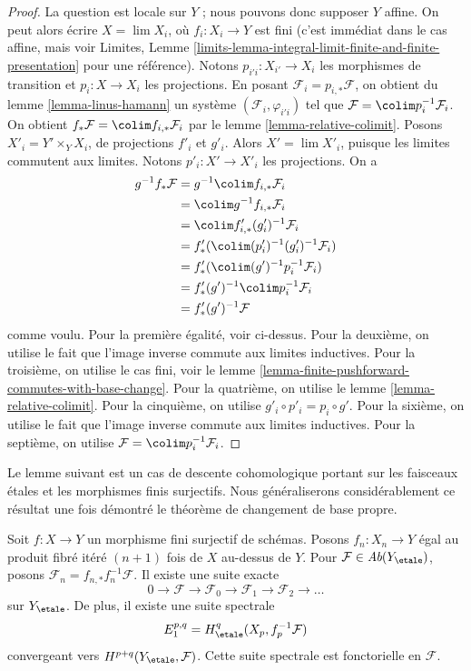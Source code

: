 \begin{proof}
La question est locale sur $Y$ ; nous pouvons donc supposer $Y$ affine.
On peut alors \'ecrire $X = \lim X_i$, o\`u $f_i : X_i \to Y$ est fini
(c'est imm\'ediat dans le cas affine, mais voir
Limites, Lemme \ref{limits-lemma-integral-limit-finite-and-finite-presentation}
pour une r\'ef\'erence). Notons $p_{i'i} : X_{i'} \to X_i$
les morphismes de transition et $p_i : X \to X_i$ les projections.
En posant $\mathcal{F}_i = p_{i, *}\mathcal{F}$, on obtient
du lemme \ref{lemma-linus-hamann}
un syst\`eme $(\mathcal{F}_i, \varphi_{i'i})$
tel que $\mathcal{F} = \colim p_i^{-1}\mathcal{F}_i$.
On obtient $f_*\mathcal{F} = \colim f_{i, *}\mathcal{F}_i$
par le lemme \ref{lemma-relative-colimit}.
Posons $X'_i = Y' \times_Y X_i$, de projections $f'_i$ et $g'_i$.
Alors $X' = \lim X'_i$, puisque les limites commutent aux limites.
Notons $p'_i : X' \to X'_i$ les projections. On a
\begin{align*}
g^{-1}f_*\mathcal{F}
& =
g^{-1} \colim f_{i, *}\mathcal{F}_i \\
& =
\colim g^{-1}f_{i, *}\mathcal{F}_i \\
& =
\colim f'_{i, *}(g'_i)^{-1}\mathcal{F}_i \\
& =
f'_*(\colim (p'_i)^{-1}(g'_i)^{-1}\mathcal{F}_i) \\
& =
f'_*(\colim (g')^{-1}p_i^{-1}\mathcal{F}_i) \\
& =
f'_*(g')^{-1} \colim p_i^{-1}\mathcal{F}_i \\
& =
f'_*(g')^{-1}\mathcal{F}
\end{align*}
comme voulu. Pour la premi\`ere \'egalit\'e, voir ci-dessus.
Pour la deuxi\`eme, on utilise le fait que l'image inverse commute aux limites inductives.
Pour la troisi\`eme, on utilise le cas fini, voir
le lemme \ref{lemma-finite-pushforward-commutes-with-base-change}.
Pour la quatri\`eme, on utilise le lemme \ref{lemma-relative-colimit}.
Pour la cinqui\`eme, on utilise $g'_i \circ p'_i = p_i \circ g'$.
Pour la sixi\`eme, on utilise le fait que l'image inverse commute aux limites inductives.
Pour la septi\`eme, on utilise $\mathcal{F} = \colim p_i^{-1}\mathcal{F}_i$.
\end{proof}

\noindent
Le lemme suivant est un cas de descente cohomologique portant sur
les faisceaux \'etales et les morphismes finis surjectifs. Nous g\'en\'eraliserons
consid\'erablement ce r\'esultat une fois d\'emontr\'e le th\'eor\`eme de changement de base propre.

\begin{lemma}
\label{lemma-cohomological-descent-finite}
Soit $f : X \to Y$ un morphisme fini surjectif de sch\'emas.
Posons $f_n : X_n \to Y$ \'egal au produit fibr\'e it\'er\'e $(n + 1)$ fois
de $X$ au-dessus de $Y$. Pour $\mathcal{F} \in \textit{Ab}(Y_\etale)$, posons
$\mathcal{F}_n = f_{n, *}f_n^{-1}\mathcal{F}$. Il existe une suite
exacte
$$
0 \to \mathcal{F} \to \mathcal{F}_0 \to \mathcal{F}_1 \to
\mathcal{F}_2 \to \ldots
$$
sur $Y_\etale$. De plus, il existe une suite spectrale
$$
E_1^{p, q} = H^q_\etale(X_p, f_p^{-1}\mathcal{F})
$$
convergeant vers $H^{p + q}(Y_\etale, \mathcal{F})$.
Cette suite spectrale est fonctorielle en $\mathcal{F}$.
\end{lemma}

